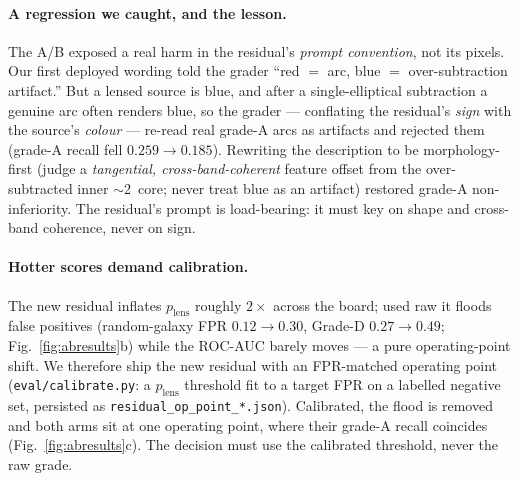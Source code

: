 \documentclass[11pt,letterpaper]{article}
\newcommand{\plens}{\ensuremath{p_{\mathrm{lens}}}}
\begin{document}
\paragraph{A regression we caught, and the lesson.} The A/B exposed a real harm in the residual's \emph{prompt
convention}, not its pixels. Our first deployed wording told the grader ``red $=$ arc, blue $=$ over-subtraction
artifact.'' But a lensed source is blue, and after a single-elliptical subtraction a genuine arc often renders blue,
so the grader --- conflating the residual's \emph{sign} with the source's \emph{colour} --- re-read real grade-A
arcs as artifacts and rejected them (grade-A recall fell $0.259\!\to\!0.185$). Rewriting the description to be
morphology-first (judge a \emph{tangential, cross-band-coherent} feature offset from the over-subtracted inner
$\sim$2\arcsec\ core; never treat blue as an artifact) restored grade-A non-inferiority. The residual's prompt is
load-bearing: it must key on shape and cross-band coherence, never on sign.

\paragraph{Hotter scores demand calibration.} The new residual inflates \plens{} roughly $2\times$ across the board;
used raw it floods false positives (random-galaxy FPR $0.12\!\to\!0.30$, Grade-D $0.27\!\to\!0.49$;
Fig.~\ref{fig:abresults}b) while the ROC-AUC barely moves --- a pure operating-point shift. We therefore ship the
new residual with an FPR-matched operating point (\texttt{eval/calibrate.py}: a \plens{} threshold fit to a target
FPR on a labelled negative set, persisted as \texttt{residual\_op\_point\_*.json}). Calibrated, the flood is removed
and both arms sit at one operating point, where their grade-A recall coincides (Fig.~\ref{fig:abresults}c). The
decision must use the calibrated threshold, never the raw grade.
\end{document}
